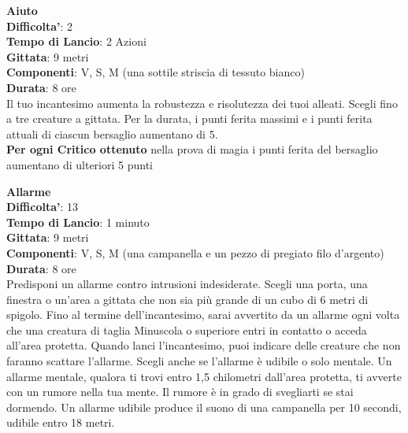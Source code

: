 \begin{multicols}{2}
\pagebreak




\textbf{Aiuto}\\
\textbf{Difficolta'}: 2\\
\textbf{Tempo di Lancio}: 2 Azioni\\
\textbf{Gittata}: 9 metri\\
\textbf{Componenti}: V, S, M (una sottile striscia di tessuto bianco)\\
\textbf{Durata}: 8 ore\\
Il tuo incantesimo aumenta la robustezza e risolutezza dei tuoi alleati. Scegli fino a tre creature a gittata. Per la durata, i punti ferita massimi e i punti ferita attuali di ciascun bersaglio aumentano di 5.\\
\textbf{Per ogni Critico ottenuto} nella prova di magia i punti ferita del bersaglio aumentano di ulteriori 5 punti

\medskip\textbf{Allarme}\\
\textbf{Difficolta'}: 13\\
\textbf{Tempo di Lancio}: 1 minuto\\
\textbf{Gittata}: 9 metri\\
\textbf{Componenti}: V, S, M (una campanella e un pezzo di pregiato filo d’argento)\\
\textbf{Durata}: 8 ore\\
Predisponi un allarme contro intrusioni indesiderate. Scegli una porta, una finestra o un’area a gittata che non sia più grande di un cubo di 6 metri di spigolo. Fino al termine dell’incantesimo, sarai avvertito da un allarme ogni volta che una creatura di taglia Minuscola o superiore entri in contatto o acceda all’area protetta. Quando lanci l’incantesimo, puoi indicare delle creature che non faranno scattare l’allarme. Scegli anche se l’allarme è udibile o solo mentale. Un allarme mentale, qualora ti trovi entro 1,5 chilometri dall’area protetta, ti avverte con un rumore nella tua mente. Il rumore è in grado di svegliarti se stai dormendo. Un allarme udibile produce il suono di una campanella per 10 secondi, udibile entro 18 metri.


\end{multicols}
